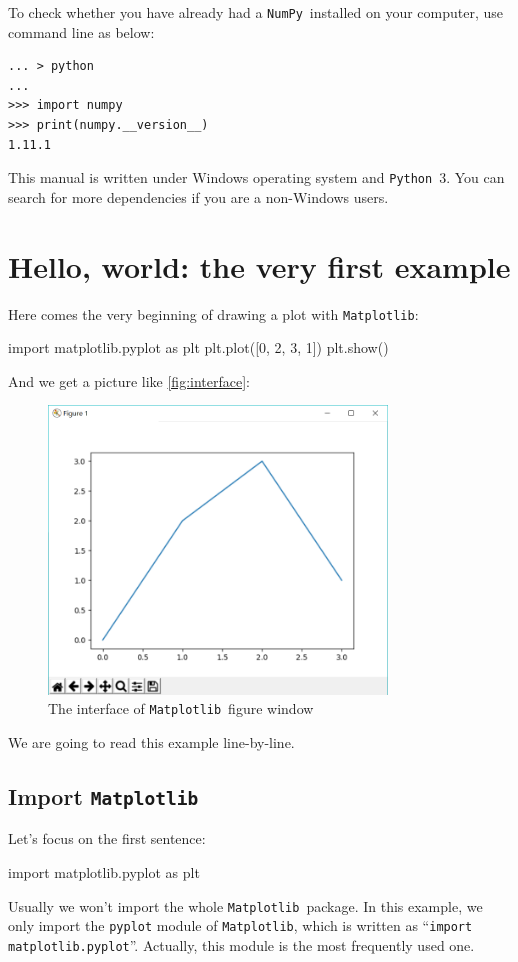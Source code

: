 \documentclass{report}
\newcommand{\pkg}[1]{\texttt{#1}}
\newcommand{\Py}{\pkg{Python}}
\newcommand{\NumPy}{\pkg{NumPy}}
\newcommand{\mpl}{\texttt{Matplotlib}}
\newcommand{\nextblock}{\vspace{2ex}}
\begin{document}
To check whether you have already had a \NumPy\ installed on your computer, use command line as below:
\begin{verbatim}
... > python
...
>>> import numpy
>>> print(numpy.__version__)
1.11.1
\end{verbatim}

\nextblock This manual is written under Windows operating system and \Py\ 3. You can search for more dependencies if you are a non-Windows users.

\section{Hello, world: the very first example}
Here comes the very beginning of drawing a plot with \mpl :
\begin{py}
import matplotlib.pyplot as plt
plt.plot([0, 2, 3, 1])
plt.show()
\end{py}

And we get a picture like \autoref{fig:interface}:

\begin{figure}[!htb]
  \centering
  \includegraphics[width=90mm]{Example-Interface.png}
  \caption{The interface of \mpl\ figure window}
  \label{fig:interface}
\end{figure}

We are going to read this example line-by-line.

\subsection{Import \mpl}
Let's focus on the first sentence:
\begin{py}
import matplotlib.pyplot as plt
\end{py}

Usually we won't import the whole \mpl\ package. In this example, we only import the \texttt{pyplot} module of \mpl , which is written as ``\texttt{import matplotlib.pyplot}''. Actually, this module is the most frequently used one. 
\end{document}

